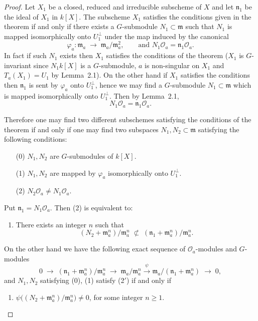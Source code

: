 \documentclass[12pt]{article}
\begin{document}
\begin{proof}
Let $X_1$ be a closed, reduced and irreducible subscheme of $X$ and let 
$\mathfrak n_1$ be the ideal of $X_1$ in $k[X]$. The subscheme $X_1$ satisfies 
the conditions given in the theorem if and only if there exists a 
$G$-submodule $N_1 \subset \mathfrak m$ such that $N_1$ is mapped 
isomorphically onto $U_1^\perp$ under the map induced by the canonical
\[
   \varphi_a : \mathfrak m_a \;\longrightarrow\; \mathfrak m_a / \mathfrak m_a^2,
   \qquad \text{and } N_1 \mathcal O_a = \mathfrak n_1 \mathcal O_a.
\]
In fact if such $N_1$ exists then $X_1$ satisfies the conditions of the theorem 
($X_1$ is $G$-invariant since $N_1 k[X]$ is a $G$-submodule, $a$ is non-singular 
on $X_1$ and $T_a(X_1)=U_1$ by Lemma~2.1). On the other hand if $X_1$ satisfies 
the conditions then $\mathfrak n_1$ is sent by $\varphi_a$ onto $U_1^\perp$, hence 
we may find a $G$-submodule $N_1 \subset \mathfrak m$ which is mapped 
isomorphically onto $U_1^\perp$. Then by Lemma~2.1,
\[
   N_1 \mathcal O_a = \mathfrak n_1 \mathcal O_a.
\]

Therefore one may find two different subschemes satisfying the conditions of 
the theorem if and only if one may find two subspaces $N_1, N_2 \subset \mathfrak m$ 
satisfying the following conditions:
\begin{enumerate}
   \item[(0)] $N_1, N_2$ are $G$-submodules of $k[X]$.
   \item[(1)] $N_1, N_2$ are mapped by $\varphi_a$ isomorphically onto $U_1^\perp$.
   \item[(2)] $N_2 \mathcal O_a \neq N_1 \mathcal O_a$.
\end{enumerate}
Put $\mathfrak n_1 = N_1 \mathcal O_a$. Then (2) is equivalent to:
\begin{enumerate}[(2$'$)]
   \item There exists an integer $n$ such that
   \[
      (N_2 + \mathfrak m_a^n)/\mathfrak m_a^n \;\not\subset\; 
      (\mathfrak n_1 + \mathfrak m_a^n)/\mathfrak m_a^n.
   \]
\end{enumerate}

On the other hand we have the following exact sequence of 
$\mathcal O_a$-modules and $G$-modules
\[
0 \;\longrightarrow\; (\mathfrak n_1 + \mathfrak m_a^n)/\mathfrak m_a^n
   \;\longrightarrow\; \mathfrak m_a/\mathfrak m_a^n 
   \xrightarrow{\;\psi\;} \mathfrak m_a/(\mathfrak n_1 + \mathfrak m_a^n)
   \;\longrightarrow\; 0,
\]
and $N_1,N_2$ satisfying (0), (1) satisfy (2$'$) if and only if
\begin{enumerate}[(2$''$)]
   \item $\psi\big( (N_2+\mathfrak m_a^n)/\mathfrak m_a^n \big) \neq 0$,
   for some integer $n \ge 1$.
\end{enumerate}


\end{proof}
\end{document}
